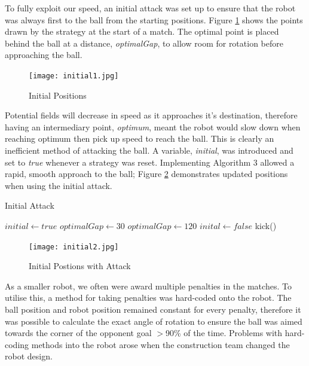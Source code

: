 To fully exploit our speed, an initial attack was set up to ensure that the robot was always first to the ball from the starting positions. Figure \ref{fig:initial1} shows the points drawn by the strategy at the start of a match. The optimal point is placed behind the ball at a distance, \textit{optimalGap}, to allow room for rotation before approaching the ball.

\begin{figure}[htp]
\begin{center}
\leavevmode
\texttt{[image: initial1.jpg]}
\end{center}
\caption{Initial Positions}
\label{fig:initial1}
\end{figure}

Potential fields will decrease in speed as it approaches it's destination, therefore having an intermediary point, \textit{optimum}, meant the robot would slow down when reaching optimum then pick up speed to reach the ball. This is clearly an inefficient method of attacking the ball. A variable, \textit{initial}, was introduced and set to \textit{true} whenever a strategy was reset. Implementing Algorithm 3 allowed a rapid, smooth approach to the ball; Figure \ref{fig:initial2} demonstrates updated positions when using the initial attack. \linebreak

\begin{algorithm}
\caption{Initial Attack}
\begin{algorithmic}[1]
\STATE $initial\gets true$
			\STATE $optimalGap\gets 30$
		\ELSE
			\STATE $optimalGap\gets 120$
			\STATE $inital\gets false$
			\STATE kick()
		\ENDIF
	\ENDIF
\ENDWHILE
\end{algorithmic}
\end{algorithm}

\begin{figure}[htp]
\begin{center}
\leavevmode
\texttt{[image: initial2.jpg]}
\end{center}
\caption{Initial Postions with Attack}
\label{fig:initial2}
\end{figure}

As a smaller robot, we often were award multiple penalties in the matches. To utilise this, a method for taking penalties was hard-coded onto the robot. The ball position and robot position remained constant for every penalty, therefore it was possible to calculate the exact angle of rotation to ensure the ball was aimed towards the corner of the opponent goal $>$90\% of the time. Problems with hard-coding methods into the robot arose when the construction team changed the robot design. \linebreak


